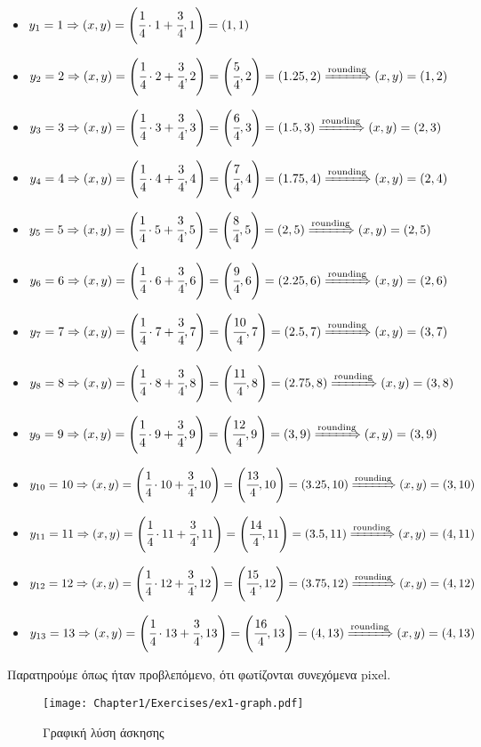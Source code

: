 \begin{solution}
\begin{itemize}
  \item $y_1 = 1 \Rightarrow (x,y) = \left( \cfrac{1}{4} \cdot 1 + \cfrac{3}{4}, 1 \right) = \left( 1, 1 \right)$
  \item $y_2 = 2 \Rightarrow (x,y) = \left( \cfrac{1}{4} \cdot 2 + \cfrac{3}{4}, 2 \right) = \left( \cfrac{5}{4}, 2 \right) = (1.25, 2) \xRightarrow{\text{rounding}} (x,y) = (1,2)$
  \item $y_3 = 3 \Rightarrow (x,y) = \left( \cfrac{1}{4} \cdot 3 + \cfrac{3}{4}, 3 \right) = \left( \cfrac{6}{4}, 3 \right) = (1.5, 3) \xRightarrow{\text{rounding}} (x,y) = (2,3)$
  \item $y_4 = 4 \Rightarrow (x,y) = \left( \cfrac{1}{4} \cdot 4 + \cfrac{3}{4}, 4 \right) = \left( \cfrac{7}{4}, 4 \right) = (1.75, 4) \xRightarrow{\text{rounding}} (x,y) = (2,4)$
  \item $y_5 = 5 \Rightarrow (x,y) = \left( \cfrac{1}{4} \cdot 5 + \cfrac{3}{4}, 5 \right) = \left( \cfrac{8}{4}, 5 \right) = (2, 5) \xRightarrow{\text{rounding}} (x,y) = (2,5)$
  \item $y_6 = 6 \Rightarrow (x,y) = \left( \cfrac{1}{4} \cdot 6 + \cfrac{3}{4}, 6 \right) = \left( \cfrac{9}{4}, 6 \right) = (2.25, 6) \xRightarrow{\text{rounding}} (x,y) = (2,6)$
  \item $y_7 = 7 \Rightarrow (x,y) = \left( \cfrac{1}{4} \cdot 7 + \cfrac{3}{4}, 7 \right) = \left( \cfrac{10}{4}, 7 \right) = (2.5, 7) \xRightarrow{\text{rounding}} (x,y) = (3,7)$
  \item $y_8 = 8 \Rightarrow (x,y) = \left( \cfrac{1}{4} \cdot 8 + \cfrac{3}{4}, 8 \right) = \left( \cfrac{11}{4}, 8 \right) = (2.75, 8) \xRightarrow{\text{rounding}} (x,y) = (3,8)$
  \item $y_9 = 9 \Rightarrow (x,y) = \left( \cfrac{1}{4} \cdot 9 + \cfrac{3}{4}, 9 \right) = \left( \cfrac{12}{4}, 9 \right) = (3, 9) \xRightarrow{\text{rounding}} (x,y) = (3,9)$
  \item $y_{10} = 10 \Rightarrow (x,y) = \left( \cfrac{1}{4} \cdot 10 + \cfrac{3}{4}, 10 \right) = \left( \cfrac{13}{4}, 10 \right) = (3.25, 10) \xRightarrow{\text{rounding}} (x,y) = (3,10)$
  \item $y_{11} = 11 \Rightarrow (x,y) = \left( \cfrac{1}{4} \cdot 11 + \cfrac{3}{4}, 11 \right) = \left( \cfrac{14}{4}, 11 \right) = (3.5, 11) \xRightarrow{\text{rounding}} (x,y) = (4,11)$
  \item $y_{12} = 12 \Rightarrow (x,y) = \left( \cfrac{1}{4} \cdot 12 + \cfrac{3}{4}, 12 \right) = \left( \cfrac{15}{4}, 12 \right) = (3.75, 12) \xRightarrow{\text{rounding}} (x,y) = (4,12)$
  \item $y_{13} = 13 \Rightarrow (x,y) = \left( \cfrac{1}{4} \cdot 13 + \cfrac{3}{4}, 13 \right) = \left( \cfrac{16}{4}, 13 \right) = (4, 13) \xRightarrow{\text{rounding}} (x,y) = (4,13)$
\end{itemize}

Παρατηρούμε όπως ήταν προβλεπόμενο, ότι φωτίζονται συνεχόμενα pixel.

\begin{figure}[hbt]
	\begin{center}
		\texttt{[image: Chapter1/Exercises/ex1-graph.pdf]}
	\end{center}
\caption{Γραφική λύση άσκησης}
\end{figure}

\end{solution}